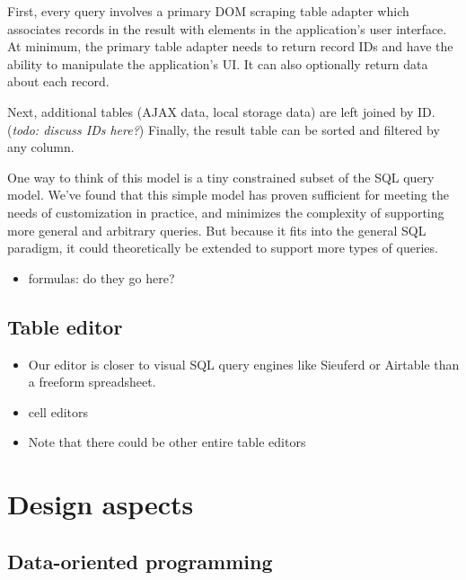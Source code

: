 \documentclass[sigplan,10pt,anonymous,review]{acmart}
\providecommand{\tightlist}{%
  \setlength{\itemsep}{0pt}\setlength{\parskip}{0pt}}
\begin{document}
First, every query involves a primary DOM scraping table adapter which
associates records in the result with elements in the application's user
interface. At minimum, the primary table adapter needs to return record
IDs and have the ability to manipulate the application's UI. It can also
optionally return data about each record.

Next, additional tables (AJAX data, local storage data) are left joined
by ID. (\emph{todo: discuss IDs here?}) Finally, the result table can be
sorted and filtered by any column.

One way to think of this model is a tiny constrained subset of the SQL
query model. We've found that this simple model has proven sufficient
for meeting the needs of customization in practice, and minimizes the
complexity of supporting more general and arbitrary queries. But because
it fits into the general SQL paradigm, it could theoretically be
extended to support more types of queries.

\begin{itemize}
\tightlist
\item
  formulas: do they go here?
\end{itemize}

\hypertarget{table-editor}{%
\subsection{Table editor}\label{table-editor}}

\begin{itemize}
\tightlist
\item
  Our editor is closer to visual SQL query engines like Sieuferd or
  Airtable than a freeform spreadsheet.
\item
  cell editors
\item
  Note that there could be other entire table editors
\end{itemize}

\hypertarget{design-aspects}{%
\section{Design aspects}\label{design-aspects}}

\hypertarget{data-oriented-programming}{%
\subsection{Data-oriented programming}\label{data-oriented-programming}}
\end{document}
